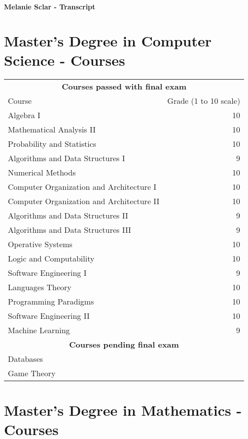\documentclass [a4paper, 10pt]{article}
\begin{document}
\begin{center}
	{\LARGE \textbf{Melanie Sclar - Transcript}}
\end{center}
\bigskip
\section{Master's Degree in Computer Science - Courses}

\begin{table}[!h]
\centering
\begin{tabular}{l r}
\multicolumn{2}{c}{\textbf{Courses passed with final exam}} \\
Course & Grade (1 to 10 scale) \\
\hline
Algebra I & 10 \\
Mathematical Analysis II & 10 \\
Probability and Statistics & 10 \\
Algorithms and Data Structures I & 9 \\
Numerical Methods & 10 \\
Computer Organization and Architecture I & 10 \\
Computer Organization and Architecture II & 10 \\ 
Algorithms and Data Structures II & 9 \\
Algorithms and Data Structures III & 9 \\
Operative Systems & 10 \\ 
Logic and Computability & 10 \\
Software Engineering I & 9 \\
Languages Theory & 10 \\
Programming Paradigms & 10 \\
Software Engineering II & 10 \\
Machine Learning & 9 \\

\hline
\multicolumn{2}{c}{\textbf{Courses pending final exam} } \\
Databases \\ 
Game Theory \\
\end{tabular}
\end{table}

\bigskip


\section{Master's Degree in Mathematics - Courses}
\end{document}
